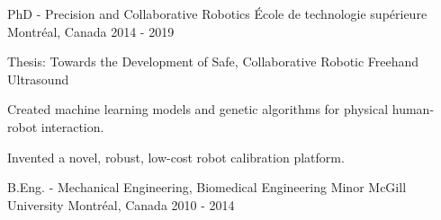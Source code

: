 \begin{cventries}

\cventry
{PhD - Precision and Collaborative Robotics}
{École de technologie supérieure}
{Montréal, Canada}
{2014 - 2019}
{
\begin{cvitems}
\item{Thesis: Towards the Development of Safe, Collaborative Robotic Freehand Ultrasound}
\item{Created machine learning models and genetic algorithms for physical human-robot interaction.}
\item{Invented a novel, robust, low-cost robot calibration platform.}
\end{cvitems}
}

\cventry
{B.Eng. - Mechanical Engineering, Biomedical Engineering Minor}
{McGill University}
{Montréal, Canada}
{2010 - 2014}
{
\begin{cvitems}
\end{cvitems}
}


\end{cventries}

